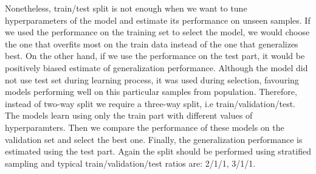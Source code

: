 \documentclass[shortabstract, english, mgr]{iithesis}
\begin{document}
Nonetheless, train/test split is not enough when we want to tune hyperparameters of the model and estimate its performance on unseen samples. If we used the performance on the training set to select the model, we would choose the one that overfits most on the train data instead of the one that generalizes best. On the other hand, if we use the performance on the test part, it would be positively biased estimate of generalization performance. Although the model did not use test set during learning process, it was used during selection, favouring models performing well on this particular samples from population. Therefore, instead of two-way split we require a three-way split, i.e train/validation/test. The models learn using only the train part with different values of hyperparamters. Then we compare the performance of these models on the validation set and select the best one. Finally, the generalization performance is estimated using the test part. Again the split should be performed using stratified sampling and typical train/validation/test ratios are: 2/1/1, 3/1/1.
\end{document}
